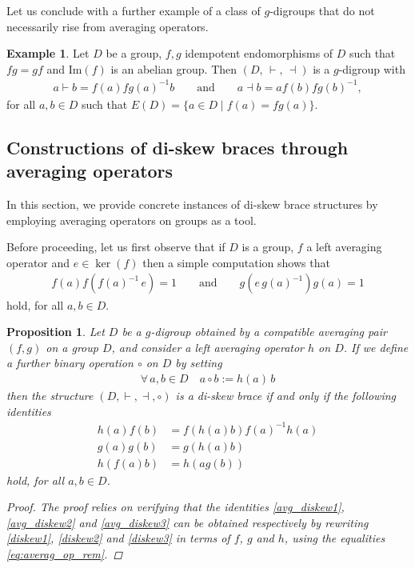 \documentclass[preprint,1p]{elsarticle}
\numberwithin{equation}{section}
\newtheorem{prop}[theor]{Proposition}
\theoremstyle{definition}               %
\newtheorem{ex}[theor]{Example}
\newcommand{\vd}{\vdash}
\newcommand{\dv}{\dashv}
\begin{document}
Let us conclude with a further example of a class of $g$-digroups that do not necessarily rise from averaging operators.

\begin{ex}\label{ex:fg=gf}
    Let $D$ be a group, $f,g$ idempotent endomorphisms of $D$ such that $fg = gf$ and $\text{Im} (f)$ is an abelian group. Then $\left(D,\, \vd,\, \dv\right)$ is a $g$-digroup with
    \begin{align*}
        a\vd b = f(a)fg(a)^{-1}b
        \qquad\text{and}\qquad
        a\dv b = af(b)fg(b)^{-1},
    \end{align*}
    for all $a,b\in D$ such that $E(D)=\{a\in D\mid f(a) = fg(a)\}$.
\end{ex}

\medskip

\subsection{Constructions of di-skew braces through averaging operators}

In this section, we provide concrete instances of di-skew brace structures by employing averaging operators on groups as a tool.
\medskip

Before proceeding, let us first observe that if $D$ is a group, $f$ a left averaging operator and $e \in \ker(f)$ then a simple computation shows that 
    \begin{align}
        f(a)f(f(a)^{-1}\,e) = 1\qquad\text{and}\qquad 
        g(e\, g(a)^{-1}) g(a) = 1 \label{eq:averag_op_rem}
    \end{align}
    hold, for all $a,b \in D$.

\smallskip

\begin{prop}\label{prop:avg_diskewbrace}
    Let $D$ be a $g$-digroup obtained by a compatible averaging pair $(f,g)$  on a group $D$, and consider a left averaging operator $h$ on $D$. If we define a further binary operation $\circ$ on $D$ by setting
    \begin{align*}
        \forall\, a,b\in D \quad
        a \circ b := h(a)\,b
    \end{align*}
    then the structure $(D,\vd,\dv,\circ)$ is a di-skew brace if and only if the following identities
    \begin{align}
    h(a)f(b) &= f(h(a)b) f(a)^{-1} h(a) \label{avg_diskew1}\tag{AD1}\\
    g(a)g(b) &= g(h(a)b) \label{avg_diskew2}\tag{AD2}\\
    h(f(a)b) &= h(ag(b)) \label{avg_diskew3}\tag{AD3}
\end{align}
    hold, for all $a,b\in D$.
    \begin{proof}  
        The proof relies on verifying that the identities \eqref{avg_diskew1}, \eqref{avg_diskew2} and \eqref{avg_diskew3} can be obtained respectively by rewriting \eqref{diskew1}, \eqref{diskew2} and \eqref{diskew3} in terms of $f$, $g$ and $h$, {using the equalities \eqref{eq:averag_op_rem}}.    
    \end{proof}
\end{prop}
\end{document}
